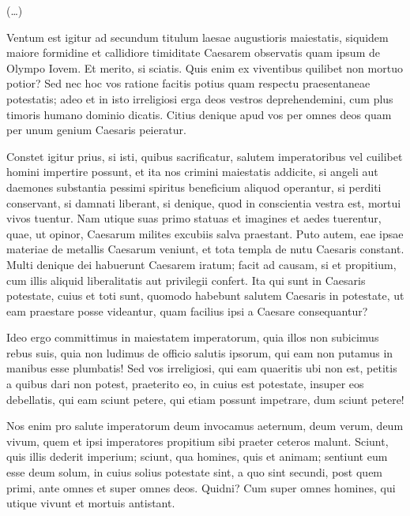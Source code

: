 (\dots)

Ventum est igitur ad secundum titulum laesae augustioris maiestatis, siquidem maiore formidine et callidiore timiditate Caesarem observatis quam ipsum de Olympo Iovem. Et merito, si sciatis. Quis enim ex viventibus quilibet non mortuo potior? Sed nec hoc vos ratione facitis potius quam respectu praesentaneae potestatis; adeo et in isto irreligiosi erga deos vestros deprehendemini, cum plus timoris humano dominio dicatis. Citius denique apud vos per omnes deos quam per unum genium Caesaris peieratur.

Constet igitur prius, si isti, quibus sacrificatur, salutem imperatoribus vel cuilibet homini impertire possunt, et ita nos crimini maiestatis addicite, si angeli aut daemones substantia pessimi spiritus beneficium aliquod operantur, si perditi conservant, si damnati liberant, si denique, quod in conscientia vestra est, mortui vivos tuentur. Nam utique suas primo statuas et imagines et aedes tuerentur, quae, ut opinor, Caesarum milites excubiis salva praestant. Puto autem, eae ipsae materiae de metallis Caesarum veniunt, et tota templa de nutu Caesaris constant. Multi denique dei habuerunt Caesarem iratum; facit ad causam, si et propitium, cum illis aliquid liberalitatis aut privilegii confert. Ita qui sunt in Caesaris potestate, cuius et toti sunt, quomodo habebunt salutem Caesaris in potestate, ut eam praestare posse videantur, quam facilius ipsi a Caesare consequantur?

Ideo ergo committimus in maiestatem imperatorum, quia illos non subicimus rebus suis, quia non ludimus de officio salutis ipsorum, qui eam non putamus in manibus esse plumbatis! Sed vos irreligiosi, qui eam quaeritis ubi non est, petitis a quibus dari non potest, praeterito eo, in cuius est potestate, insuper eos debellatis, qui eam sciunt petere, qui etiam possunt impetrare, dum sciunt petere!

Nos enim pro salute imperatorum deum invocamus aeternum, deum verum, deum vivum, quem et ipsi imperatores propitium sibi praeter ceteros malunt. Sciunt, quis illis dederit imperium; sciunt, qua homines, quis et animam; sentiunt eum esse deum solum, in cuius solius potestate sint, a quo sint secundi, post quem primi, ante omnes et super omnes deos. Quidni? Cum super omnes homines, qui utique vivunt et mortuis antistant. 
